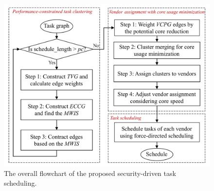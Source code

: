 \documentclass[10pt,journal, compsoc]{IEEEtran}
\begin{document}

\begin{figure}[!t]
\centering
\includegraphics[width=\linewidth]{figure/overall_flow.pdf}
\caption{The overall flowchart of the proposed security-driven task scheduling.}
\label{fig:overall_flow}
\end{figure}

\end{document}
